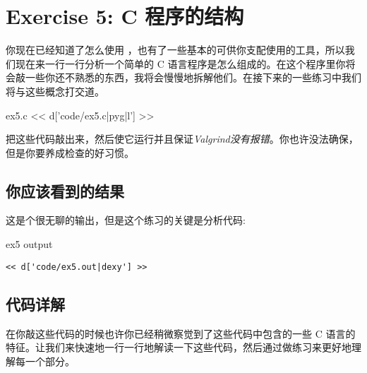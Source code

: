 \chapter{Exercise 5: C 程序的结构}

你现在已经知道了怎么使用  ，也有了一些基本的可供你支配使用的工具，所以我们现在来一行一行分析一个简单的 C 语言程序是怎么组成的。在这个程序里你将会敲一些你还不熟悉的东西，我将会慢慢地拆解他们。在接下来的一些练习中我们将与这些概念打交道。

\begin{code}{ex5.c}
<< d['code/ex5.c|pyg|l'] >>
\end{code}

把这些代码敲出来，然后使它运行并且保证\emph{Valgrind没有报错}。你也许没法确保，但是你要养成检查的好习惯。

\section{你应该看到的结果}

这是个很无聊的输出，但是这个练习的关键是分析代码:

\begin{code}{ex5 output}
\begin{lstlisting}
<< d['code/ex5.out|dexy'] >>
\end{lstlisting}
\end{code}

\section{代码详解}

在你敲这些代码的时候也许你已经稍微察觉到了这些代码中包含的一些 C 语言的特征。让我们来快速地一行一行地解读一下这些代码，然后通过做练习来更好地理解每一个部分。

